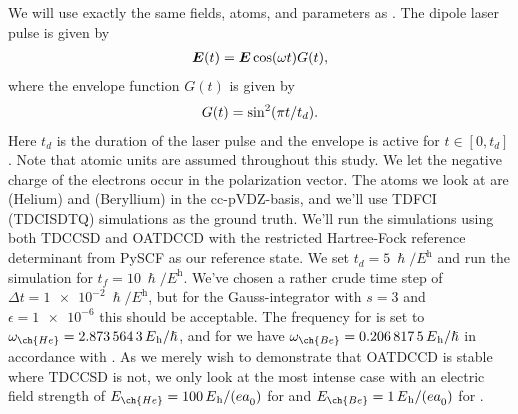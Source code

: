         We will use exactly the same fields, atoms, and parameters as
        \citeauthor{pedersen2018symplectic}.
        The dipole laser pulse is given by
        \begin{align}
            \vfg{E}(t)
            = \vfg{E} \cosine(\omega t) G(t),
        \end{align}
        where the envelope function $G(t)$ is given by
        \begin{align}
            G(t)
            = \sine^2(\pi t / t_d).
        \end{align}
        Here $t_d$ is the duration of the laser pulse and the envelope is active
        for $t \in [0, t_d]$.
        Note that atomic units are assumed throughout this study.
        We let the negative charge of the electrons occur in the polarization
        vector.
        The atoms we look at are  (Helium) and  (Beryllium) in the
        cc-pVDZ-basis, and we'll use TDFCI (TDCISDTQ) simulations as the ground
        truth.
        We'll run the simulations using both TDCCSD and OATDCCD with the
        restricted Hartree-Fock reference determinant from PySCF as our
        reference state.
        We set $t_d = \SI{5}{\hslash/\hartree}$ and run the simulation for $t_f
        = \SI{10}{\hslash/\hartree}$.
        We've chosen a rather crude time step of $\Delta t =
        \SI{1e-2}{\hslash/\hartree}$, but for the Gauss-integrator with $s = 3$
        and $\epsilon = \num{1e-6}$ this should be acceptable.
        The frequency for  is set to $\omega_{\ch{He}} =
        \SI{2.8735643}{\hartree/\hslash}$, and for  we have
        $\omega_{\ch{Be}} = \SI{0.2068175}{\hartree/\hslash}$ in accordance with
        \citeauthor{pedersen2018symplectic} \cite{pedersen2018symplectic}.
        As we merely wish to demonstrate that OATDCCD is stable where TDCCSD is
        not, we only look at the most intense case with an electric field
        strength of $E_{\ch{He}} = \SI{100}{\hartree/(\elementarycharge \bohr)}$
        for  and $E_{\ch{Be}} =
        \SI{1}{\hartree/(\elementarycharge\bohr)}$ for .

